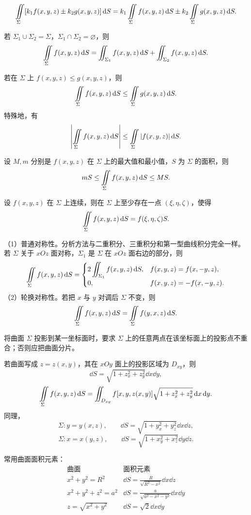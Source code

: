 \[
\iint\limits_{\Sigma}[k_1f(x,y,z)\pm k_2g(x,y,z)]\mathop{}\!\mathrm d S
=k_1\iint\limits_{\Sigma} f(x,y,z)\mathop{}\!\mathrm d S
\pm k_2\iint\limits_{\Sigma} g(x,y,z)\mathop{}\!\mathrm d S.
\]

若 $\Sigma_1\cup\Sigma_2=\Sigma$，$\Sigma_1\cap\Sigma_2=\varnothing$，则
\[
\iint\limits_{\Sigma} f(x,y,z)\mathop{}\!\mathrm d S
=\iint_{\Sigma_1}f(x,y,z)\mathop{}\!\mathrm d S
+\iint_{\Sigma_2}f(x,y,z)\mathop{}\!\mathrm d S.
\]

若在 $\Sigma$ 上 $f(x,y,z)\le g(x,y,z)$，则
\[
\iint\limits_{\Sigma} f(x,y,z)\mathop{}\!\mathrm d S\le\iint\limits_{\Sigma} g(x,y,z)\mathop{}\!\mathrm d S.
\]
特殊地，有
\[
\left|\iint\limits_{\Sigma} f(x,y,z)\mathop{}\!\mathrm d S\right|
\le\iint\limits_{\Sigma}|f(x,y,z)|\mathop{}\!\mathrm d S.
\]

设 $M,m$ 分别是 $f(x,y,z)$ 在 $\Sigma$ 上的最大值和最小值，$S$ 为 $\Sigma$ 的面积，则
\[
mS\le\iint\limits_{\Sigma} f(x,y,z)\mathop{}\!\mathrm d S\le MS.
\]

设 $f(x,y,z)$ 在 $\Sigma$ 上连续，则在 $\Sigma$ 上至少存在一点 $(\xi,\eta,\zeta)$，使得
\[
\iint\limits_{\Sigma} f(x,y,z)\mathop{}\!\mathrm d S=f(\xi,\eta,\zeta)S.
\]


（1）普通对称性。分析方法与二重积分、三重积分和第一型曲线积分完全一样。若 $\Sigma$ 关于 $xOz$ 面对称，$\Sigma_1$ 是 $\Sigma$ 在 $xOz$ 面右边的部分，则
\[
\iint\limits_{\Sigma} f(x,y,z)\mathop{}\!\mathrm d S=
\begin{cases}
2\displaystyle\iint_{\Sigma_1}f(x,y,z)\mathop{}\!\mathrm d S,&f(x,y,z)=f(x,-y,z),\\[2mm]
0,&f(x,y,z)=-f(x,-y,z).
\end{cases}
\]
（2）轮换对称性。若把 $x$ 与 $y$ 对调后 $\Sigma$ 不变，则
\[
\iint\limits_{\Sigma} f(x,y,z)\mathop{}\!\mathrm d S=\iint\limits_{\Sigma} f(y,x,z)\mathop{}\!\mathrm d S.
\]


将曲面 $\Sigma$ 投影到某一坐标面时，要求 $\Sigma$ 上的任意两点在该坐标面上的投影点不重合；否则应把曲面分片。

若曲面写成 $z=z(x,y)$，其在 $xOy$ 面上的投影区域为 $D_{xy}$，则
\[
\dd S=\sqrt{1+z_x^2+z_y^2}\dd x\dd y,
\]
\[
\iint\limits_{\Sigma} f(x,y,z)\mathop{}\!\mathrm d S
=\iint_{D_{xy}}f[x,y,z(x,y)]
\sqrt{1+z_x^2+z_y^2}\mathop{}\!\mathrm d x\mathop{}\!\mathrm d y.
\]
同理，
\[
\Sigma:y=y(x,z),\qquad
\dd S=\sqrt{1+y_x^2+y_z^2}\dd x\dd z,
\]
\[
\Sigma:x=x(y,z),\qquad
\dd S=\sqrt{1+x_y^2+x_z^2}\dd y\dd z.
\]

常用曲面面积元素：
\[
\begin{array}{c|c}
\text{曲面}&\text{面积元素}\\ \hline
x^2+y^2=R^2&\displaystyle\dd S=\frac{R}{\sqrt{R^2-x^2}}\dd x\dd z\\[5pt]
x^2+y^2+z^2=a^2&\displaystyle\dd S=\frac{a}{\sqrt{a^2-x^2-y^2}}\dd x\dd y\\[5pt]
z=\sqrt{x^2+y^2}&\displaystyle\dd S=\sqrt2\dd x\dd y
\end{array}
\]

